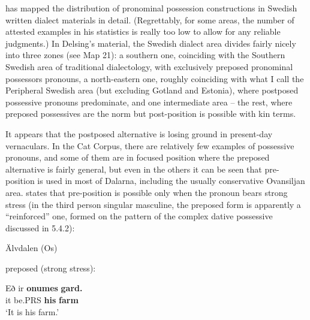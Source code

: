 {%
\citet[32]{Delsing2003a} has mapped the distribution of pronominal possession constructions in Swedish written dialect materials in detail. (Regrettably, for some areas, the number of attested examples in his statistics is really too low to allow for any reliable judgments.) In Delsing’s material, the Swedish dialect area divides fairly nicely into three zones (see Map 21): a southern one, coinciding with the Southern Swedish area of traditional dialectology, with exclusively preposed pronominal possessors pronouns, a north-eastern one, roughly coinciding with what I call the Peripheral Swedish area (but excluding Gotland and Estonia), where postposed possessive pronouns predominate, and one intermediate area – the rest, where preposed possessives are the norm but post-position is possible with kin terms.


It appears that the postposed alternative is losing ground in present-day vernaculars. In the Cat Corpus, there are relatively few examples of possessive pronouns, and some of them are in focused position where the preposed alternative is fairly general, but even in the others it can be seen that pre-position is used in most of Dalarna, including the usually conservative Ovansiljan area. \citet[111]{Levander1909} states that pre-position is possible only when the pronoun bears strong stress (in the third person singular masculine, the preposed form is apparently a “reinforced” one, formed on the pattern of the complex dative possessive discussed in 5.4.2):


\item 

Älvdalen (Os)



\item 

preposed (strong stress):



\ea\label{}
\gll Eð  ir  \textbf{onumes} \textbf{gard.}\\
it  be.PRS  \textbf{his} \textbf{farm}\\
\glt ‘It is his farm.’
\z

}
